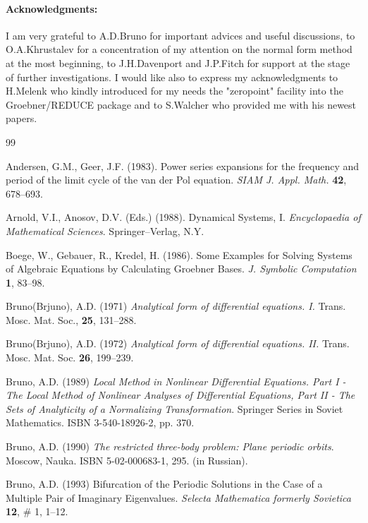 \paragraph{Acknowledgments:}
I am very grateful to A.D.Bruno for important advices  and useful 
discussions,  to O.A.Khrustalev for a concentration of 
my attention on the normal form method at the most beginning, to 
J.H.Davenport and J.P.Fitch for support at the stage of further
investigations. I would like also to express my acknowledgments
to H.Melenk who kindly introduced for my needs the "zeropoint" 
facility into the Groebner/REDUCE package and to S.Walcher who 
provided me with his newest papers.


\begin{thebibliography}{99}

Andersen, G.M., Geer, J.F. (1983). Power series expansions for
the frequency and period of the limit cycle of the van der Pol
equation. {\em SIAM J. Appl. Math.\/} {\bf 42}, 678--693.

Arnold, V.I., Anosov, D.V. (Eds.) (1988). Dynamical Systems, I. 
{\em Encyclopaedia of Mathematical Sciences\/}. Springer--Verlag,
N.Y.

Boege, W., Gebauer, R., Kredel, H. (1986). Some
Examples for Solving Systems of Algebraic Equations by Calculating
Groebner Bases. {\em  J. Symbolic Computation\/} {\bf 1}, 83--98.

Bruno(Brjuno), A.D. (1971)
{\em Analytical form of differential equations. I.\/} Trans. Mosc. 
Mat. Soc.,  {\bf 25}, 131--288.

Bruno(Brjuno), A.D. (1972)
{\em Analytical form of differential equations. II.\/} Trans. Mosc. 
Mat. Soc. {\bf 26}, 199--239.


Bruno, A.D. (1989)
{\em Local Method in Nonlinear Differential Equations. 
Part  I - The Local Method of Nonlinear Analyses of  Differential 
Equations,  Part  II - The Sets of Analyticity of  a  Normalizing 
Transformation\/}. Springer Series in Soviet Mathematics.  ISBN 
3-540-18926-2,  pp. 370.

Bruno, A.D. (1990)
{\em The restricted three-body problem: Plane periodic orbits\/}. 
Moscow, Nauka. ISBN 5-02-000683-1, 295. (in Russian).

Bruno, A.D. (1993) Bifurcation of the Periodic
Solutions in the Case of a Multiple Pair of Imaginary Eigenvalues.
{\em Selecta Mathematica {\em formerly} Sovietica\/} {\bf 12}, 
\# 1, 1--12.


\end{thebibliography}
